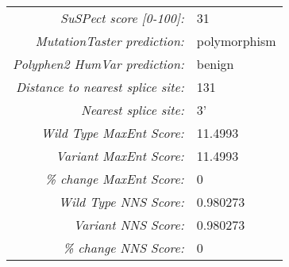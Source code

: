 \documentclass{report}\usepackage[]{graphicx}\usepackage[]{color}
\begin{document}
\begin{longtable}{|rp{6cm}|}
  \textit{SuSPect score [0-100]:} & 31 \\ 
  \textit{MutationTaster prediction:} & polymorphism \\ 
  \textit{Polyphen2 HumVar prediction:} & benign \\ 
  \textit{Distance to nearest splice site:} & 131 \\ 
  \textit{Nearest splice site:} & 3' \\ 
  \textit{Wild Type MaxEnt Score:} & 11.4993 \\ 
  \textit{Variant MaxEnt Score:} & 11.4993 \\ 
  \textit{\% change MaxEnt Score:} & 0 \\ 
  \textit{Wild Type NNS Score:} & 0.980273 \\ 
  \textit{Variant NNS Score:} & 0.980273 \\ 
  \textit{\% change NNS Score:} & 0 \\ 
  \hline
\end{longtable}


\smallskip
\end{document}
